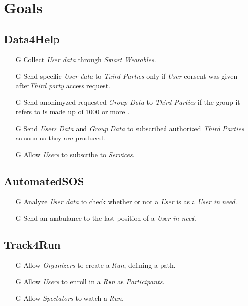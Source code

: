 \documentclass[../../rasd.tex]{subfiles}
\begin{document}
\section{Goals}

				\subsection{Data4Help}
					\begin{itemize}
						
						\item[G\subs{1}]Collect \textit{User data} through \textit{Smart Wearables}.
						
						\item[G\subs{2}]Send specific \textit{User data} to \textit{Third Parties} only if \textit{User} consent was given after\textit{Third party} access request.
						\item[G\subs{3}]Send anonimyzed requested \textit{Group Data} to \textit{Third Parties} if the group it refers to is made up of 1000 or more .

						\item[G\subs{4}]Send \textit{Users Data} and \textit{Group Data} to subscribed authorized \textit{Third Parties} as soon as they are produced.
						
						\item[G\subs{5}]Allow \textit{Users} to subscribe to \textit{Services}.		
						
					\end{itemize}

				\subsection{AutomatedSOS}
					\begin{itemize}
						\item[G\subs{6}]Analyze \textit{User data} to check whether or not a \textit{User} is as a \textit{User in need}.
						\item[G\subs{7}]Send an ambulance to the last position of a \textit{User in need}.
					\end{itemize}

				\subsection{Track4Run}
					\begin{itemize}
						\item[G\subs{8}]Allow \textit{Organizers} to create a \textit{Run}, defining a path.
						\item[G\subs{9}]Allow \textit{Users} to enroll in a \textit{Run} as \textit{Participants}. 
						\item[G\subs{10}]Allow \textit{Spectators} to watch a \textit{Run}.
					\end{itemize}
\end{document}
